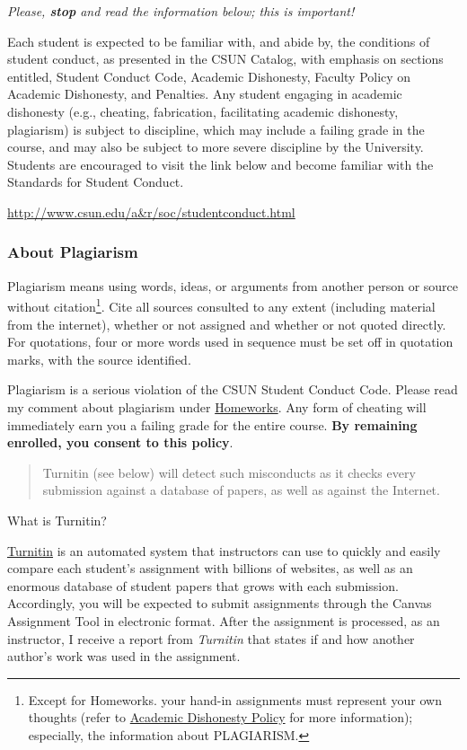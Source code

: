 \documentclass[11pt,]{article}
\begin{document}
\emph{Please, \textbf{stop} and read the information below; this is
important!}

Each student is expected to be familiar with, and abide by, the
conditions of student conduct, as presented in the CSUN Catalog, with
emphasis on sections entitled, Student Conduct Code, Academic
Dishonesty, Faculty Policy on Academic Dishonesty, and Penalties. Any
student engaging in academic dishonesty (e.g., cheating, fabrication,
facilitating academic dishonesty, plagiarism) is subject to discipline,
which may include a failing grade in the course, and may also be subject
to more severe discipline by the University. Students are encouraged to
visit the link below and become familiar with the Standards for Student
Conduct.

\url{http://www.csun.edu/a\&r/soc/studentconduct.html}

\hypertarget{about-plagiarism}{%
\subsubsection{About Plagiarism}\label{about-plagiarism}}

Plagiarism means using words, ideas, or arguments from another person or
source without citation\footnote{Except for Homeworks. your hand-in
  assignments must represent your own thoughts (refer to
  \protect\hyperlink{dishonesty}{Academic Dishonesty Policy} for more
  information); especially, the information about PLAGIARISM.}. Cite all
sources consulted to any extent (including material from the internet),
whether or not assigned and whether or not quoted directly. For
quotations, four or more words used in sequence must be set off in
quotation marks, with the source identified.

Plagiarism is a serious violation of the CSUN Student Conduct Code.
Please read my comment about plagiarism under
\protect\hyperlink{homeworks}{Homeworks}. Any form of cheating will
immediately earn you a failing grade for the entire course. \textbf{By
remaining enrolled, you consent to this policy}.

\begin{quote}
Turnitin (see below) will detect such misconducts as it checks every
submission against a database of papers, as well as against the
Internet.
\end{quote}

What is Turnitin?

\href{https://www.turnitin.com/}{Turnitin} is an automated system that
instructors can use to quickly and easily compare each student's
assignment with billions of websites, as well as an enormous database of
student papers that grows with each submission. Accordingly, you will be
expected to submit assignments through the Canvas Assignment Tool in
electronic format. After the assignment is processed, as an instructor,
I receive a report from \emph{Turnitin} that states if and how another
author's work was used in the assignment.
\end{document}
